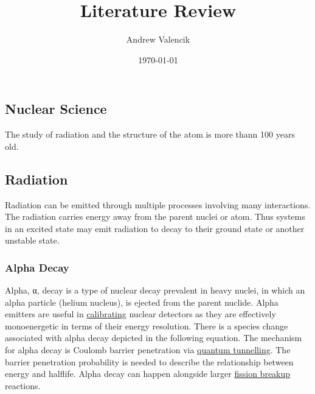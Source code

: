 \documentclass[12pt]{article}
\begin{document}
\title{Literature Review}
\author{Andrew Valencik}
\date{\today}
\maketitle
\tableofcontents
\begin{doublespacing}


\pagebreak
\section{Nuclear Science}
The study of radiation and the structure of the atom is more thann 100 years old.

\subsection{Radiation}
Radiation can be emitted through multiple processes involving many interactions. The radiation carries energy away from the parent nuclei or atom. Thus systems in an excited state may emit radiation to decay to their ground state or another unstable state. 

\subsubsection{Alpha Decay}
Alpha, α, decay is a type of nuclear decay prevalent in heavy nuclei, in which an alpha particle (helium nucleus), is ejected from the parent nuclide. Alpha emitters are useful in \href{http://cs.smu.ca/~andrew/files/ugthesis/SMU-Thesis-v.1.0.1.pdf}{calibrating} nuclear detectors as they are effectively monoenergetic in terms of their energy resolution. There is a species change associated with alpha decay depicted in the following equation.
The mechanism for alpha decay is Coulomb barrier penetration via \href{https://en.wikipedia.org/wiki/Quantum_tunneling}{quantum tunnelling}. The barrier penetration probability is needed to describe the relationship between energy and halflife. Alpha decay can happen alongside larger \href{https://en.wikipedia.org/wiki/Nuclear_fission}{fission breakup} reactions.


\end{doublespacing}
\end{document}
